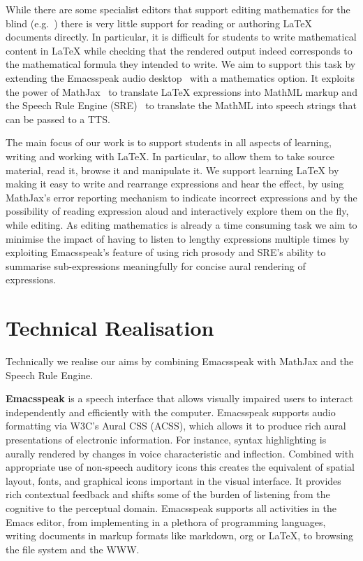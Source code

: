 \documentclass{sig-alternate}
\begin{document}
While there are some specialist editors that support editing mathematics for the
blind (e.g.~\cite{Pearson}) there is very little support for reading or
authoring {\LaTeX} documents directly.  In particular, it is difficult for
students to write mathematical content in {\LaTeX} while checking that the
rendered output indeed corresponds to the mathematical formula they intended to
write. We aim to support this task by extending the Emacsspeak audio
desktop~\cite{Emacsspeak} with a mathematics option. It exploits the power of
MathJax~\cite{MathJax2.6} to translate {\LaTeX} expressions into MathML markup
and the Speech Rule Engine (SRE)~\cite{SRE} to translate the MathML into speech
strings that can be passed to a TTS.

The main focus of our work is to support students in all aspects of learning,
writing and working with {\LaTeX}. In particular, to allow them to take source
material, read it, browse it and manipulate it. We support learning {\LaTeX} by
making it easy to write and rearrange expressions and hear the effect, by using
MathJax's error reporting mechanism to indicate incorrect expressions and by the
possibility of reading expression aloud and interactively explore them on the
fly, while editing.  As editing mathematics is already a time consuming task we
aim to minimise the impact of having to listen to lengthy expressions multiple
times by exploiting Emacsspeak's feature of using rich prosody and SRE's ability
to summarise sub-expressions meaningfully for concise aural rendering of
expressions.


\section{Technical Realisation}
\label{sec:background}

Technically we realise our aims by combining Emacsspeak with MathJax and the
Speech Rule Engine.

\textbf{Emacsspeak} is a speech interface that allows visually impaired users to
interact independently and efficiently with the computer. Emacsspeak supports
audio formatting via W3C's Aural CSS (ACSS), which allows it to produce rich
aural presentations of electronic information.  For instance, syntax
highlighting is aurally rendered by changes in voice characteristic and
inflection. Combined with appropriate use of non-speech auditory icons this
creates the equivalent of spatial layout, fonts, and graphical icons important
in the visual interface. It provides rich contextual feedback and shifts some of
the burden of listening from the cognitive to the perceptual domain.  Emacsspeak
supports all activities in the Emacs editor, from implementing in a plethora of
programming languages, writing documents in markup formats like markdown, org or
{\LaTeX}, to browsing the file system and the WWW.
\end{document}
